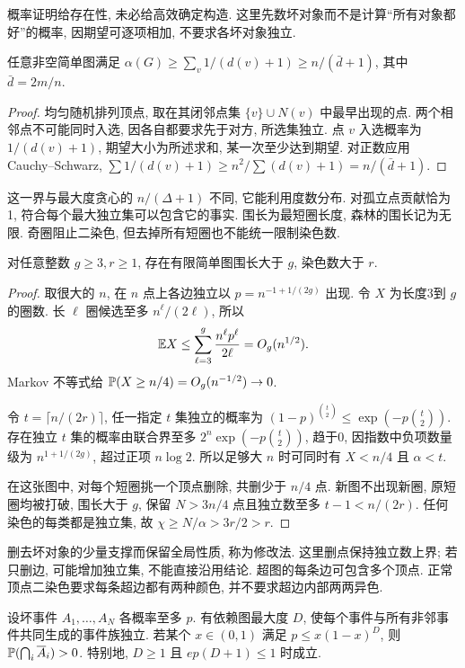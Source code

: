 概率证明给存在性, 未必给高效确定构造. 这里先数坏对象而不是计算“所有对象都好”的概率, 因期望可逐项相加, 不要求各坏对象独立.
\begin{theorem}\label{thm:carowei}
任意非空简单图满足 $\alpha(G)\ge\sum_v1/(d(v)+1)\ge n/(\bar d+1)$, 其中 $\bar d=2m/n$.
\end{theorem}
\begin{proof}
均匀随机排列顶点, 取在其闭邻点集 $\{v\}\cup N(v)$ 中最早出现的点. 两个相邻点不可能同时入选, 因各自都要求先于对方, 所选集独立. 点 $v$ 入选概率为 $1/(d(v)+1)$, 期望大小为所述求和, 某一次至少达到期望. 对正数应用 Cauchy--Schwarz, $\sum1/(d(v)+1)\ge n^2/\sum(d(v)+1)=n/(\bar d+1)$.
\end{proof}
这一界与最大度贪心的 $n/(\Delta+1)$ 不同, 它能利用度数分布. 对孤立点贡献恰为1, 符合每个最大独立集可以包含它的事实.
围长为最短圈长度, 森林的围长记为无限. 奇圈阻止二染色, 但去掉所有短圈也不能统一限制染色数.
\begin{theorem}\label{thm:highgirth}
对任意整数 $g\ge3,r\ge1$, 存在有限简单图围长大于 $g$, 染色数大于 $r$.
\end{theorem}
\begin{proof}
取很大的 $n$, 在 $n$ 点上各边独立以 $p=n^{-1+1/(2g)}$ 出现. 令 $X$ 为长度3到 $g$ 的圈数. 长 $\ell$ 圈候选至多 $n^\ell/(2\ell)$, 所以
\[
\mathbb E X\le\sum_{\ell=3}^g\frac{n^\ell p^\ell}{2\ell}=O_g(n^{1/2}).
\]
Markov 不等式给 $\mathbb P(X\ge n/4)=O_g(n^{-1/2})\to0$.

令 $t=\lceil n/(2r)\rceil$, 任一指定 $t$ 集独立的概率为 $(1-p)^{\binom t2}\le\exp(-p\binom t2)$. 存在独立 $t$ 集的概率由联合界至多 $2^n\exp(-p\binom t2)$, 趋于0, 因指数中负项数量级为 $n^{1+1/(2g)}$, 超过正项 $n\log2$. 所以足够大 $n$ 时可同时有 $X<n/4$ 且 $\alpha<t$.

在这张图中, 对每个短圈挑一个顶点删除, 共删少于 $n/4$ 点. 新图不出现新圈, 原短圈均被打破, 围长大于 $g$, 保留 $N>3n/4$ 点且独立数至多 $t-1<n/(2r)$. 任何染色的每类都是独立集, 故 $\chi\ge N/\alpha>3r/2>r$.
\end{proof}
删去坏对象的少量支撑而保留全局性质, 称为修改法. 这里删点保持独立数上界; 若只删边, 可能增加独立集, 不能直接沿用结论.
超图的每条边可包含多个顶点. 正常顶点二染色要求每条超边都有两种颜色, 并不要求超边内部两两异色.
\begin{theorem}[对称局部引理]\label{thm:lll}
设坏事件 $A_1,\ldots,A_N$ 各概率至多 $p$. 有依赖图最大度 $D$, 使每个事件与所有非邻事件共同生成的事件族独立. 若某个 $x\in(0,1)$ 满足 $p\le x(1-x)^D$, 则 $\mathbb P(\bigcap_i\overline A_i)>0$. 特别地, $D\ge1$ 且 $ep(D+1)\le1$ 时成立.
\end{theorem}
